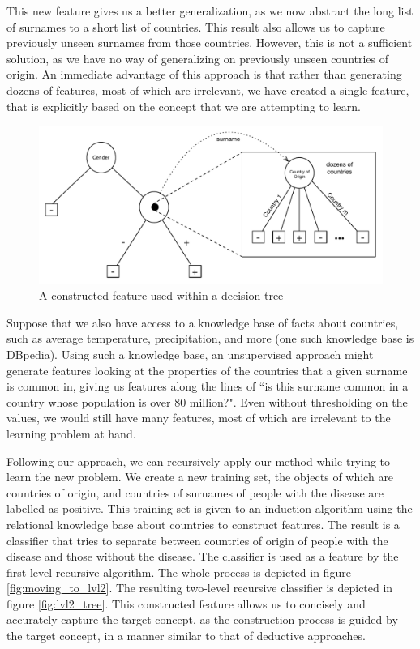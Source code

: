 \documentclass[twoside,11pt]{article}
\theoremstyle{definition}
\begin{document}
This new feature gives us a better generalization, as we now abstract the long list of surnames to a short list of countries. This result also allows us to capture previously unseen surnames from those countries. However, this is not a sufficient solution, as we have no way of generalizing on previously unseen countries of origin. An immediate advantage of this approach is that rather than generating dozens of features, most of which are irrelevant, we have created a single feature, that is explicitly based on the concept that we are attempting to learn. 


\begin{figure}
	\centering
	\includegraphics[width=\linewidth]{fig2.pdf}
	\caption{A constructed feature used within a decision tree}
	\label{fig:lvl1_tree}
\end{figure}

Suppose that we also have access to a knowledge base of facts about countries, such as average temperature, precipitation, and more (one such knowledge base is DBpedia). Using such a knowledge base, an unsupervised approach might generate features looking at the properties of the countries that a given surname is common in, giving us features along the lines of ``is this surname common in a country whose population is over 80 million?". Even without thresholding on the values, we would still have many features, most of which are irrelevant to the learning problem at hand.

Following our approach, we can recursively apply our method while trying to learn the new problem. We create a new training set, the objects of which are countries of origin, and countries of surnames of people with the disease are labelled as positive. This training set is given to an induction algorithm using the relational knowledge base about countries to construct features. The result is a classifier that tries to separate between countries of origin of people with the disease and those without the disease. The classifier is used as a feature by the first level recursive algorithm. The whole process is depicted in figure \ref{fig:moving_to_lvl2}. The resulting two-level recursive classifier is depicted in figure \ref{fig:lvl2_tree}. This constructed feature allows us to concisely and accurately capture the target concept, as the construction process is guided by the target concept, in a manner similar to that of deductive approaches.
\end{document}

